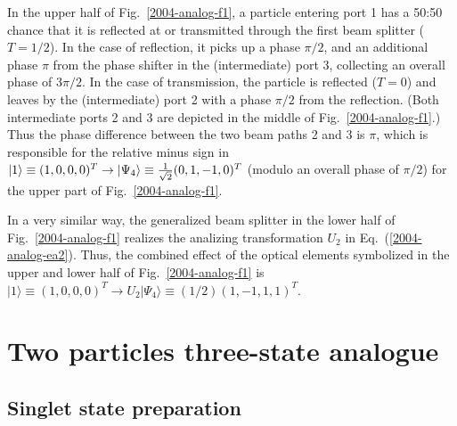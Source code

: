 \documentclass[pra,preprint,showpacs,showkeys,amsfonts]{revtex4}
\begin{document}
In the upper half of Fig.~\ref{2004-analog-f1},
a particle entering port 1 has a 50:50 chance that
it is reflected at or transmitted through the first beam splitter ($T=1/2$).
In the case of reflection, it picks up a phase $\pi /2$, and an additional phase $\pi$
from the phase shifter in the (intermediate) port 3, collecting an overall phase of $3\pi /2$.
In the case of transmission, the particle is reflected  ($T=0$)
and leaves by the (intermediate) port 2 with a phase $\pi /2$ from the reflection.
(Both intermediate ports 2 and 3 are depicted in the middle of Fig.~\ref{2004-analog-f1}.)
Thus the phase difference between the two beam paths 2 and 3 is $\pi$,
which is responsible for the relative minus sign in
$\vert 1\rangle \equiv (1,0,0,0)^T
\rightarrow
\vert \Psi_4 \rangle \equiv {1\over \sqrt{2}}(0,1,-1,0)^T$
(modulo an overall phase of $\pi /2$) for the upper part of Fig.~\ref{2004-analog-f1}.



In a very similar way, the generalized beam splitter
in the lower half of Fig.~\ref{2004-analog-f1} realizes
the analizing transformation
$U_2$ in Eq.~(\ref{2004-analog-ea2}).
Thus, the combined effect of the optical elements symbolized
in the upper and lower half of Fig.~\ref{2004-analog-f1}
is $\vert 1\rangle \equiv (1,0,0,0)^T
\rightarrow
U_{2}\vert \Psi_4\rangle \equiv (1/2)(1,-1,1,1)^T$.



\section{Two particles three-state analogue}
\label{2004-analog-2p3s}

\subsection{Singlet state preparation}
\end{document}

